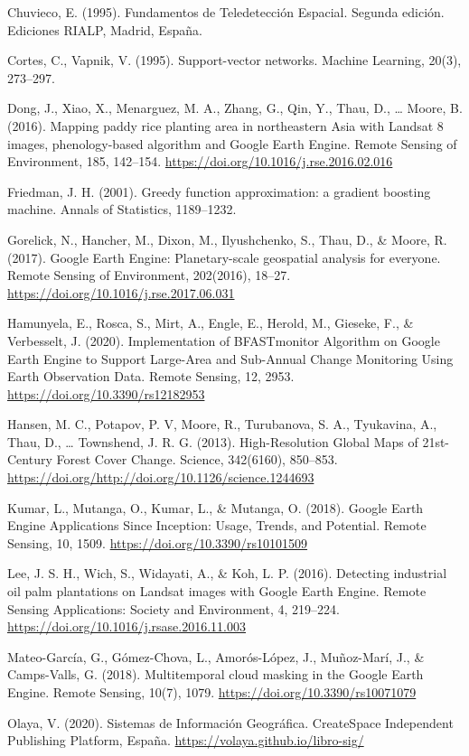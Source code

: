 \documentclass[
  12pt,
  letterpaper,
  twoside]{book}
\begin{document}
Chuvieco, E. (1995). Fundamentos de Teledetección Espacial. Segunda edición. Ediciones RIALP, Madrid, España.

Cortes, C., Vapnik, V. (1995). Support-vector networks. Machine Learning, 20(3), 273--297.

Dong, J., Xiao, X., Menarguez, M. A., Zhang, G., Qin, Y., Thau, D., \ldots{} Moore, B. (2016). Mapping paddy rice planting area in northeastern Asia with Landsat 8 images, phenology-based algorithm and Google Earth Engine. Remote Sensing of Environment, 185, 142--154. \url{https://doi.org/10.1016/j.rse.2016.02.016}

Friedman, J. H. (2001). Greedy function approximation: a gradient boosting machine. Annals of Statistics, 1189--1232.

Gorelick, N., Hancher, M., Dixon, M., Ilyushchenko, S., Thau, D., \& Moore, R. (2017). Google Earth Engine: Planetary-scale geospatial analysis for everyone. Remote Sensing of Environment, 202(2016), 18--27. \url{https://doi.org/10.1016/j.rse.2017.06.031}

Hamunyela, E., Rosca, S., Mirt, A., Engle, E., Herold, M., Gieseke, F., \& Verbesselt, J. (2020). Implementation of BFASTmonitor Algorithm on Google Earth Engine to Support Large-Area and Sub-Annual Change Monitoring Using Earth Observation Data. Remote Sensing, 12, 2953. \url{https://doi.org/10.3390/rs12182953}

Hansen, M. C., Potapov, P. V, Moore, R., Turubanova, S. A., Tyukavina, A., Thau, D., \ldots{} Townshend, J. R. G. (2013). High-Resolution Global Maps of 21st-Century Forest Cover Change. Science, 342(6160), 850--853. \url{https://doi.org/http://doi.org/10.1126/science.1244693}

Kumar, L., Mutanga, O., Kumar, L., \& Mutanga, O. (2018). Google Earth Engine Applications Since Inception: Usage, Trends, and Potential. Remote Sensing, 10, 1509. \url{https://doi.org/10.3390/rs10101509}

Lee, J. S. H., Wich, S., Widayati, A., \& Koh, L. P. (2016). Detecting industrial oil palm plantations on Landsat images with Google Earth Engine. Remote Sensing Applications: Society and Environment, 4, 219--224. \url{https://doi.org/10.1016/j.rsase.2016.11.003}

Mateo-García, G., Gómez-Chova, L., Amorós-López, J., Muñoz-Marí, J., \& Camps-Valls, G. (2018). Multitemporal cloud masking in the Google Earth Engine. Remote Sensing, 10(7), 1079. \url{https://doi.org/10.3390/rs10071079}

Olaya, V. (2020). Sistemas de Información Geográfica. CreateSpace Independent Publishing Platform, España. \url{https://volaya.github.io/libro-sig/}
\end{document}
